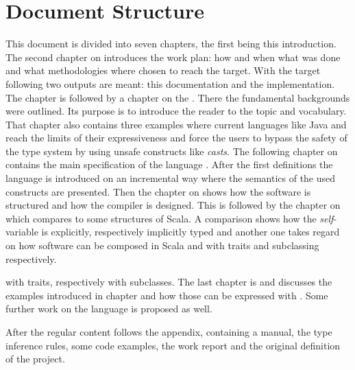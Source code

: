 \section{Document Structure}
This document is divided into seven chapters, the first being this introduction. The second chapter on
\emph{} introduces the work plan: how and
when what was done and what methodologies where chosen to reach
the target. With the target following two outputs are meant: this documentation and
the implementation. The chapter is followed by a chapter on the
\emph{}. There the fundamental
backgrounds were outlined. Its purpose is to introduce the
reader to the topic and vocabulary. That chapter also contains three examples
where current languages like Java and \cs reach the limits of their expressiveness
and force the users to bypass the safety of the type system
by using unsafe constructs like \emph{casts}. The following
chapter on \emph{} contains
the main specification of the language \ooplss. After the first
definitions the language is introduced on an incremental way where
the semantics of the used constructs are presented. Then the chapter on
\emph{} shows how the software is
structured and how the compiler is designed. This is followed by the
chapter on \emph{} which compares \ooplss to some structures of Scala. A comparison shows how the
\emph{self}-variable is explicitly, respectively implicitly typed and
another one takes regard on how software can be composed in Scala and \ooplss
with traits and subclassing respectively.

with traits,
respectively with subclasses. The last chapter is
\emph{} and discusses the examples
introduced in chapter \emph{} and how
those can be expressed with \ooplss. Some further work on the language
is proposed as well.

After the regular content follows the appendix, containing a manual, the type
inference rules, some code examples, the work report and the original
definition of the project.

